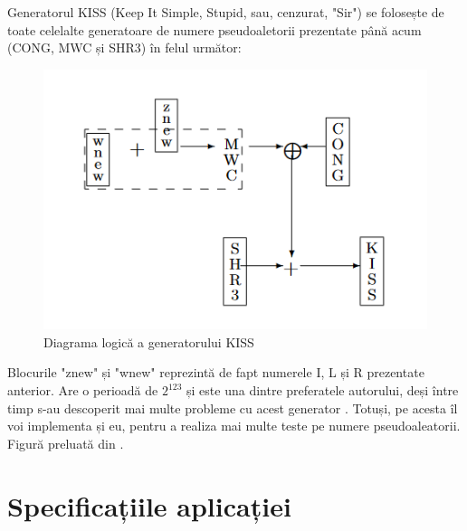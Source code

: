 Generatorul KISS (Keep It Simple, Stupid, sau, cenzurat, "Sir") se folosește de toate celelalte generatoare de numere pseudoaletorii prezentate până acum (CONG, MWC și SHR3) în felul următor:
\begin{figure}[H]
    \centering
    \includegraphics{continut/capitol1/figuri/KissDiagram.png}
    \caption{Diagrama logică a generatorului KISS}
    \label{fig:GeneratorKissDiagrama}
\end{figure}

Blocurile "znew" și "wnew" reprezintă de fapt numerele I, L și R prezentate anterior. Are o perioadă de $2^{123}$ și este una dintre preferatele autorului, deși între timp s-au descoperit mai multe probleme cu acest generator \cite{KISSABitTooSimple}. Totuși, pe acesta îl voi implementa și eu, pentru a realiza mai multe teste pe numere pseudoaleatorii. Figură preluată din \cite{KISSABitTooSimple}.

\section{Specificațiile aplicației}

